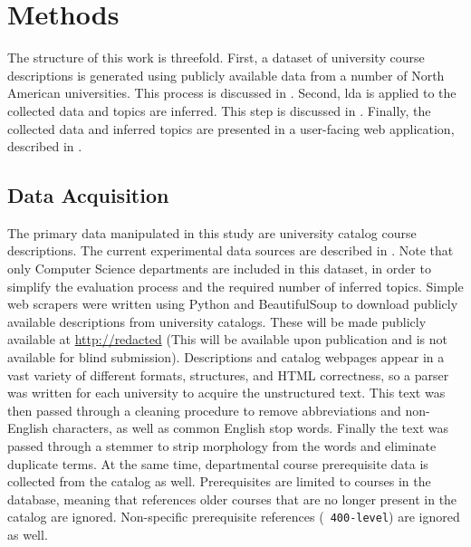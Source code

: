 \section{Methods}
\label{sec:methods}


The structure of this work is threefold.
First, a dataset of university course descriptions is generated using publicly available data from a number of North American universities.
This process is discussed in .
Second, \ac{lda} is applied to the collected data and topics are inferred.
This step is discussed in .
Finally, the collected data and inferred topics are presented in a user-facing web application, described in .


\subsection{Data Acquisition}
\label{sec:data-acquisition}


The primary data manipulated in this study are university catalog course descriptions.
The current experimental data sources are described in .
Note that only Computer Science departments are included in this dataset, in order to simplify the evaluation process and the required number of inferred topics.
Simple web scrapers were written using Python and BeautifulSoup to download publicly available descriptions from university catalogs.
These will be made publicly available at
\url{http://redacted} (This will be available upon publication and is not available for blind submission).
Descriptions and catalog webpages appear in a vast variety of different formats, structures, and HTML correctness, so a parser was written for each university to acquire the unstructured text.
This text was then passed through a cleaning procedure to remove abbreviations and non-English characters, as well as common English stop words.
Finally the text was passed through a stemmer to strip morphology from the words and eliminate duplicate terms.
At the same time, departmental course prerequisite data is collected from the catalog as well.
Prerequisites are limited to courses in the database, meaning that references older courses that are no longer present in the catalog are ignored.
Non-specific prerequisite references (\eg\ \texttt{400-level}) are ignored as well.

